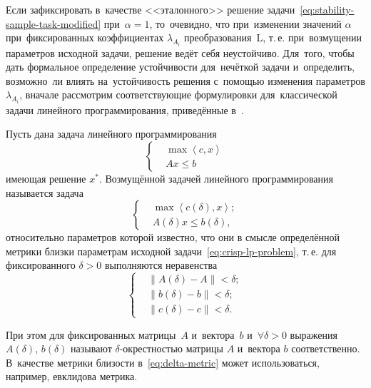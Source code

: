 Если зафиксировать в~качестве <<эталонного>> решение задачи~\eqref{eq:stability-sample-task-modified} при~$\alpha=1$, то~очевидно, что при~изменении значений $\alpha$ при~фиксированных коэффициентах $\lambda_{A_i}$ преобразования~L, т.\,е. при~возмущении параметров исходной задачи, решение ведёт себя неустойчиво. Для~того, чтобы дать формальное определение устойчивости для~нечёткой задачи и~определить, возможно~ли влиять на~устойчивость решения с~помощью изменения параметров $\lambda_{A_i}$, вначале рассмотрим соответствующие формулировки для~классической задачи линейного программирования, приведённые в~\cite{Ashmanov}.

Пусть дана задача линейного программирования
\begin{equation}
\label{eq:crisp-lp-problem}
  \left\{ \begin{aligned}
    & \max \left\langle c,x \right\rangle \\ 
    & Ax\leqslant b
  \end{aligned} \right.
\end{equation}
имеющая решение $x^{*}$. Возмущённой задачей линейного программирования называется задача
\begin{equation}
\label{eq:crisp-lp-problem-unstable}
  \left\{ \begin{aligned}
    & \max \left\langle c\left(\delta \right),x \right\rangle; \\ 
    & A\left( \delta  \right)x\leqslant b\left(\delta \right),
  \end{aligned} \right.
\end{equation}
относительно параметров которой известно, что они в смысле определённой метрики близки параметрам исходной задачи~\eqref{eq:crisp-lp-problem}, т.\,е. для фиксированного $\delta>0$ выполняются неравенства
\begin{equation}
\label{eq:delta-metric}
  \left\{ \begin{aligned}
    & \left\| A\left( \delta  \right)-A \right\|<\delta; \\ 
    & \left\| b\left( \delta  \right)-b \right\|<\delta; \\ 
    & \left\| c\left( \delta  \right)-c \right\|<\delta.
  \end{aligned} \right.
\end{equation}

При этом для фиксированных матрицы~$A$ и~вектора~$b$ и~$\forall \delta >\text{0}$ выражения $A\left(\delta \right)$, $b\left(\delta \right)$ называют $\delta$-окрестностью матрицы $A$ и~вектора $b$ соответственно. В~качестве метрики близости в~\eqref{eq:delta-metric} может использоваться, например, евклидова метрика.

